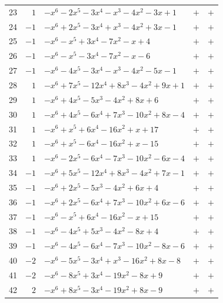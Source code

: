 \documentclass[11pt]{article}
\begin{document}
\begin{longtable}{@{}rrlcc@{}}
23 & $1$ & $-x^{6}-2x^{5}-3x^{4}-x^{3}-4x^{2}-3x+1$ & $+$ & $+$\\
24 & $-1$ & $-x^{6}+2x^{5}-3x^{4}+x^{3}-4x^{2}+3x-1$ & $+$ & $+$\\
25 & $-1$ & $-x^{6}-x^{5}+3x^{4}-7x^{2}-x+4$ & $+$ & $+$\\
26 & $-1$ & $-x^{6}-x^{5}-3x^{4}-7x^{2}-x-6$ & $+$ & $+$\\
27 & $-1$ & $-x^{6}-4x^{5}-3x^{4}-x^{3}-4x^{2}-5x-1$ & $+$ & $+$\\
28 & $1$ & $-x^{6}+7x^{5}-12x^{4}+8x^{3}-4x^{2}+9x+1$ & $+$ & $+$\\
29 & $1$ & $-x^{6}+4x^{5}-5x^{3}-4x^{2}+8x+6$ & $+$ & $+$\\
30 & $1$ & $-x^{6}+4x^{5}-6x^{4}+7x^{3}-10x^{2}+8x-4$ & $+$ & $+$\\
31 & $1$ & $-x^{6}+x^{5}+6x^{4}-16x^{2}+x+17$ & $+$ & $+$\\
32 & $1$ & $-x^{6}+x^{5}-6x^{4}-16x^{2}+x-15$ & $+$ & $+$\\
33 & $1$ & $-x^{6}-2x^{5}-6x^{4}-7x^{3}-10x^{2}-6x-4$ & $+$ & $+$\\
34 & $-1$ & $-x^{6}+5x^{5}-12x^{4}+8x^{3}-4x^{2}+7x-1$ & $+$ & $+$\\
35 & $-1$ & $-x^{6}+2x^{5}-5x^{3}-4x^{2}+6x+4$ & $+$ & $+$\\
36 & $-1$ & $-x^{6}+2x^{5}-6x^{4}+7x^{3}-10x^{2}+6x-6$ & $+$ & $+$\\
37 & $-1$ & $-x^{6}-x^{5}+6x^{4}-16x^{2}-x+15$ & $+$ & $+$\\
38 & $-1$ & $-x^{6}-4x^{5}+5x^{3}-4x^{2}-8x+4$ & $+$ & $+$\\
39 & $-1$ & $-x^{6}-4x^{5}-6x^{4}-7x^{3}-10x^{2}-8x-6$ & $+$ & $+$\\
40 & $-2$ & $-x^{6}-5x^{5}-3x^{4}+x^{3}-16x^{2}+8x-8$ & $+$ & $+$\\
41 & $-2$ & $-x^{6}-8x^{5}+3x^{4}-19x^{2}-8x+9$ & $+$ & $+$\\
42 & $2$ & $-x^{6}+8x^{5}-3x^{4}-19x^{2}+8x-9$ & $+$ & $+$\\
\end{longtable}
\endgroup
\end{document}

